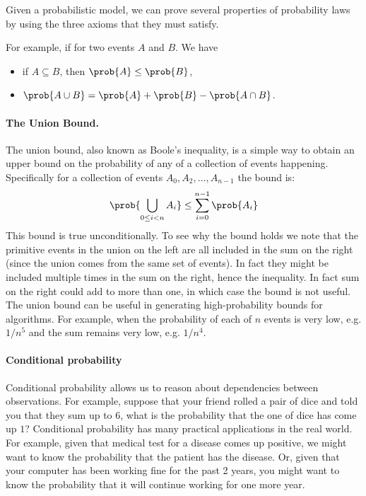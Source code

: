 {Given a probabilistic model, 
we can prove several properties of probability laws by using the
three axioms that they must satisfy.

For example, if for two events $A$ and $B$.  We have
\begin{itemize}
\item if $A \subseteq B$, then  $\prob{A} \le \prob{B}$,
\item $\prob{A \cup B} = \prob{A}  + \prob{B} -  \prob{A \cap B}$.
\end{itemize}

\paragraph{The Union Bound.}  

The union bound, also known as Boole's inequality, is a simple way to
obtain an upper bound on the probability of any of a collection of events
happening.  Specifically for a collection of events
$A_0, A_2, \ldots, A_{n-1}$ the bound is:
\[
\prob{\bigcup_{0 \leq i < n} A_i} \leq \sum_{i=0}^{n-1} \prob{A_i} 
\]
This bound is true unconditionally.
%
To see why the bound holds we note that the primitive events
in the union on the left are all included in the sum on the right
(since the union comes from the same set of events).  
%
In fact they
might be included multiple times in the sum on the right, hence the
inequality.  In fact sum on the right could add to more than one, in
which case the bound is not useful.  
%
The union bound can be useful in generating high-probability bounds
for algorithms. For example, when the probability of each of $n$
events is very low, e.g. $1/n^5$ and the sum remains very low,
e.g. $1/n^4$.



\paragraph{Conditional probability}


Conditional probability allows us to reason about dependencies between
observations.  
%
For example, suppose that  your friend rolled a pair of dice and told
you that they sum up to $6$, what is the probability that the one of
dice has come up $1$?  
%
Conditional probability has many practical applications in the real
world.  
%
For example, given that medical test for a disease comes up
positive, we might want to know  the probability that the patient has the disease. 
%
Or, given that your computer has been working fine for the past 2
years, you might want to know the probability that it will continue
working for one more year.



}
